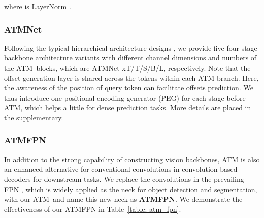 \documentclass[letterpaper]{article} \usepackage{aaai23v}  \usepackage{times}  \usepackage{helvet}  \usepackage{courier}  \usepackage[hyphens]{url}  \usepackage{graphicx} \urlstyle{rm} \def\UrlFont{\rm}  \usepackage{caption} \frenchspacing  \setlength{\pdfpagewidth}{8.5in}  \setlength{\pdfpageheight}{11in}  \usepackage{algorithm}
\newcommand{\ours}{{ATMNet}}
\newcommand{\ourcore}{{ATM}}
\newcommand{\oursxt}{ATMNet-xT}
\begin{document}
where  is LayerNorm \cite{ba2016LayerNorm}.



\noindent
\subsubsection{\ours} 
Following the typical hierarchical architecture designs \cite{he2016deepresnet,liu2021swin}, we provide five four-stage backbone architecture variants with different channel dimensions and numbers of the \ourcore~blocks, which are \oursxt/T/S/B/L, respectively. 
Note that the offset generation layer is shared across the tokens within each ATM branch. 
Here, the awareness of the position of query token can facilitate offsets prediction. We thus introduce one positional encoding generator (PEG) \cite{chu2021CPVT} for each stage before ATM, which helps a little for dense prediction tasks. More details are placed in the supplementary.





\noindent
\subsubsection{ATMFPN}
In addition to the strong capability of constructing vision backbones, ATM is also an enhanced alternative for conventional convolutions in convolution-based decoders for downstream tasks. We replace the convolutions in the prevailing FPN \cite{lin2017FPN}, which is widely applied as the neck for object detection and segmentation, with our \ourcore~and name this new neck as \textbf{ATMFPN}. We demonstrate the effectiveness of our {ATMFPN} in Table~\ref{table: atm_fpn}.   
\end{document}
